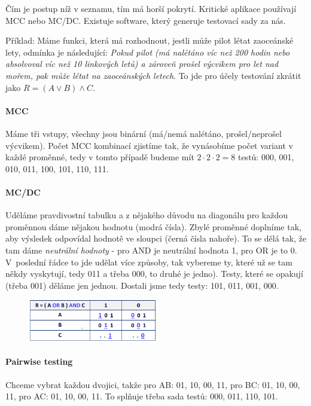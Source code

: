 Čím je postup níž v seznamu, tím má horší pokrytí. Kritické aplikace používají MCC nebo MC/DC. Existuje software, který generuje testovací sady za nás.

Příklad: Máme funkci, která má rozhodnout, jestli může pilot létat zaoceánské lety, odmínka je následující: \textit{Pokud pilot (má nalétáno víc než 200 hodin nebo absolvoval víc než 10 linkových letů) a zároveň prošel výcvikem pro let nad mořem, pak může létat na zaoceánských letech}. To jde pro účely testování zkrátit jako $R = ( A \vee B ) \wedge C$.

\paragraph{MCC} Máme tři vstupy, všechny jsou binární (má/nemá nalétáno, prošel/neprošel výcvikem). Počet MCC kombinací zjistíme tak, že vynásobíme počet variant v každé proměnné, tedy v tomto případě budeme mít $2\cdot 2 \cdot 2 = 8$ testů: 000, 001, 010, 011, 100, 101, 110, 111.

\paragraph{MC/DC} Uděláme pravdivostní tabulku a z nějakého důvodu na diagonálu pro každou proměnnou dáme nějakou hodnotu (modrá čísla). Zbylé proměnné doplníme tak, aby výsledek odpovídal hodnotě ve sloupci (černá čísla nahoře). To se dělá tak, že tam dáme \textit{neutrální hodnoty} - pro AND je neutrální hodnota 1, pro OR je to 0. V~poslední řádce to jde udělat více způsoby, tak vybereme ty, které už se tam někdy vyskytují, tedy 011 a třeba 000, to druhé je jedno). Testy, které se opakují (třeba 001) děláme jen jednou. Dostali jsme tedy testy: 101, 011, 001, 000.

\begin{figure}[ht!]
\centering
\includegraphics[width=0.5\textwidth]{ZKS/img/mcdc.png}
\end{figure}

\paragraph{Pairwise testing} Chceme vybrat každou dvojici, takže pro AB: 01, 10, 00, 11, pro BC: 01, 10, 00, 11, pro AC: 01, 10, 00, 11. To splňuje třeba sada testů: 000, 011, 110, 101. 


